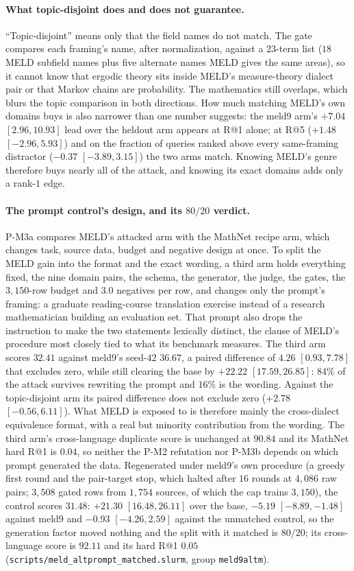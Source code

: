 \paragraph{What topic-disjoint does and does not guarantee.}``Topic-disjoint'' means only that the field names do not match. The gate compares each framing's name, after normalization, against a $23$-term list ($18$ MELD subfield names plus five alternate names MELD gives the same areas), so it cannot know that ergodic theory sits inside MELD's measure-theory dialect pair or that Markov chains are probability. The mathematics still overlaps, which blurs the topic comparison in both directions. How much matching MELD's own domains buys is also narrower than one number suggests: the meld9 arm's $+7.04$ $[2.96, 10.93]$ lead over the heldout arm appears at R@1 alone; at R@5 ($+1.48$ $[-2.96, 5.93]$) and on the fraction of queries ranked above every same-framing distractor ($-0.37$ $[-3.89, 3.15]$) the two arms match. Knowing MELD's genre therefore buys nearly all of the attack, and knowing its exact domains adds only a rank-$1$ edge.

\paragraph{The prompt control's design, and its $80/20$ verdict.}
P-M3a compares MELD's attacked arm with the MathNet recipe arm, which changes task, source data, budget and negative design at once. To split the MELD gain into the format and the exact wording, a third arm holds everything fixed, the nine domain pairs, the schema, the generator, the judge, the gates, the $3{,}150$-row budget and $3.0$ negatives per row, and changes only the prompt's framing: a graduate reading-course translation exercise instead of a research mathematician building an evaluation set. That prompt also drops the instruction to make the two statements lexically distinct, the clause of MELD's procedure most closely tied to what its benchmark measures. The third arm scores $32.41$ against meld9's seed-$42$ $36.67$, a paired difference of $4.26$ $[0.93, 7.78]$ that excludes zero, while still clearing the base by $+22.22$ $[17.59, 26.85]$: $84\%$ of the attack survives rewriting the prompt and $16\%$ is the wording. Against the topic-disjoint arm its paired difference does not exclude zero ($+2.78$ $[-0.56, 6.11]$). What MELD is exposed to is therefore mainly the cross-dialect equivalence format, with a real but minority contribution from the wording. The third arm's cross-language duplicate score is unchanged at $90.84$ and its MathNet hard R@1 is $0.04$, so neither the P-M2 refutation nor P-M3b depends on which prompt generated the data. Regenerated under meld9's own procedure (a greedy first round and the pair-target stop, which halted after $16$ rounds at $4{,}086$ raw pairs; $3{,}508$ gated rows from $1{,}754$ sources, of which the cap trains $3{,}150$), the control scores $31.48$: $+21.30$ $[16.48, 26.11]$ over the base, $-5.19$ $[-8.89, -1.48]$ against meld9 and $-0.93$ $[-4.26, 2.59]$ against the unmatched control, so the generation factor moved nothing and the split with it matched is $80/20$; its cross-language score is $92.11$ and its hard R@1 $0.05$ (\texttt{scripts/meld\_altprompt\_matched.slurm}, group \texttt{meld9altm}).

